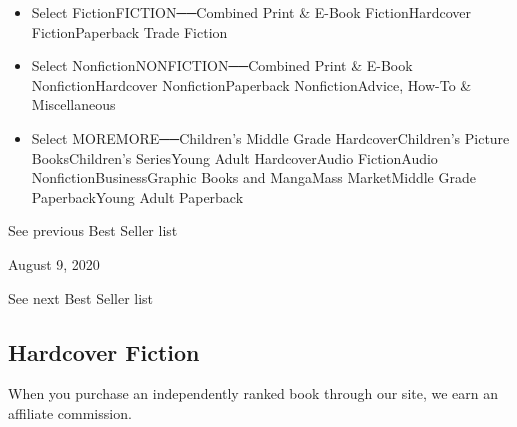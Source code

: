 \begin{itemize}
\tightlist
\item
  Select FictionFICTION──Combined Print \& E-Book FictionHardcover
  FictionPaperback Trade Fiction
\item
  Select NonfictionNONFICTION──Combined Print \& E-Book
  NonfictionHardcover NonfictionPaperback NonfictionAdvice, How-To \&
  Miscellaneous
\item
  Select MOREMORE──Children's Middle Grade HardcoverChildren's Picture
  BooksChildren's SeriesYoung Adult HardcoverAudio FictionAudio
  NonfictionBusinessGraphic Books and MangaMass MarketMiddle Grade
  PaperbackYoung Adult Paperback
\end{itemize}

\href{/books/best-sellers/2020/08/02/hardcover-fiction/}{}

See previous Best Seller list

August 9, 2020

See next Best Seller list

\hypertarget{hardcover-fiction}{%
\subsection{Hardcover Fiction}\label{hardcover-fiction}}

When you purchase an independently ranked book through our site, we earn
an affiliate commission.

